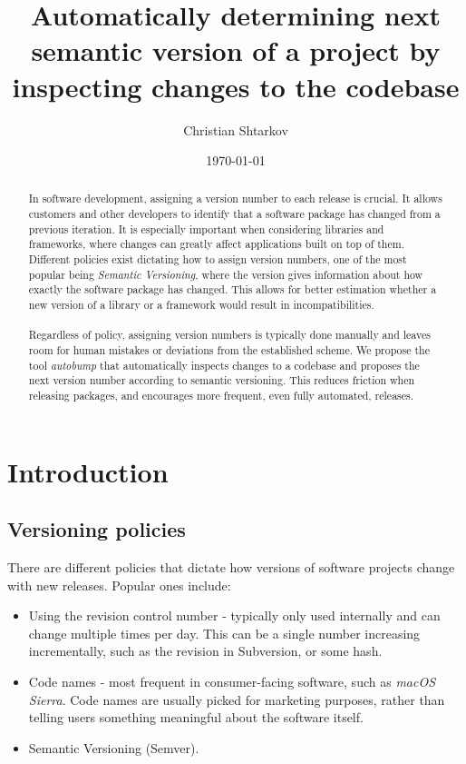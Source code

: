 \documentclass{l4proj}
\begin{document}
\title{Automatically determining next semantic version of a project by \\
  inspecting changes to the codebase}
\author{Christian Shtarkov}
\date{\today}
\maketitle

\begin{abstract}
In software development, assigning a version number
to each release is crucial. It allows customers and other developers
to identify that a software package has changed from a previous
iteration. It is especially important when considering libraries and
frameworks, where changes can greatly affect applications built on top
of them. \\ Different policies exist dictating how to assign version
numbers, one of the most popular being \textit{Semantic
Versioning}\cite{SemanticVersioning}, where the version gives
information about how exactly the software package has changed. This
allows for better estimation whether a new version of a library or a
framework would result in incompatibilities.
\\\\
Regardless of
policy, assigning version numbers is typically done manually and
leaves room for human mistakes or deviations from the established
scheme. We propose the tool \textit{autobump} that automatically
inspects changes to a codebase and proposes the next version number
according to semantic versioning. This reduces friction when releasing
packages, and encourages more frequent, even fully automated,
releases.
\end{abstract}

\educationalconsent

\tableofcontents

\chapter{Introduction}

\section{Versioning policies}

There are different policies that dictate how versions of software
projects change with new releases. Popular ones include:

\begin{itemize}
\item Using the revision control number - typically only used
internally and can change multiple times per day. This can be a single
number increasing incrementally, such as the revision in Subversion,
or some hash.
\item Code names - most frequent in consumer-facing software, such as
\textit{macOS Sierra}. Code names are usually picked for marketing
purposes, rather than telling users something meaningful about the
software itself.
\item Semantic Versioning (Semver)\cite{SemanticVersioning}.
\end{itemize}
\end{document}
